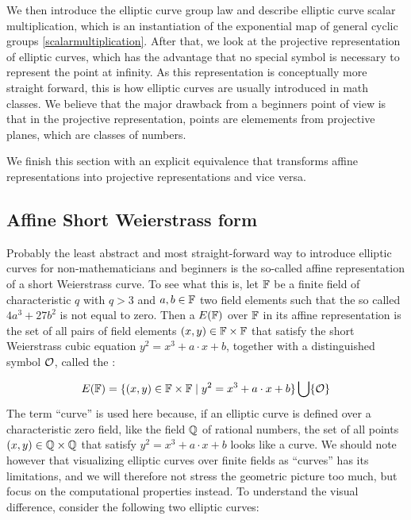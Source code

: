 We then introduce the elliptic curve group law and describe elliptic curve scalar multiplication, which is an instantiation of the exponential map of general cyclic groups \ref{scalarmultiplication}. After that, we look at the projective representation of elliptic curves, which has the advantage that no special symbol is necessary to represent the point at infinity. As this representation is conceptually more straight forward, this is how elliptic curves are usually introduced in math classes. We believe that the major drawback from a beginners point of view is that in the projective representation, points are elemements from projective planes, which are classes of numbers.

We finish this section with an explicit equivalence that transforms affine representations into projective representations and vice versa.

\subsection{Affine Short Weierstrass form} Probably the least abstract and most straight-forward way to introduce elliptic curves for non-mathematicians and beginners is the so-called affine representation of a short Weierstrass curve. To see what this is, let $\mathbb{F}$ be a finite field of characteristic $q$ with $q>3$ and $a,b\in \mathbb{F}$ two field elements such that the so called  $4a^3+ 27b^2$ is not equal to zero. Then a  $E(\mathbb{F})$ over $\mathbb{F}$ in its affine representation is the set of all pairs of field elements $(x,y)\in \mathbb{F}\times \mathbb{F}$ that satisfy the short Weierstrass cubic equation $y^2=x^3+a\cdot x+b$, together with a distinguished symbol $\mathcal{O}$, called the :

\begin{equation}
\label{def_short_weierstrass_curve}
E(\mathbb{F}) = \{(x,y)\in \mathbb{F}\times \mathbb{F}\;|\; y^2=x^3+a\cdot x+b \} \bigcup \{\mathcal{O}\}
\end{equation}
The term ``curve'' is used here because, if an elliptic curve is defined over a characteristic zero field, like the field $\mathbb{Q}$ of rational numbers, the set of all points $(x,y)\in \mathbb{Q}\times \mathbb{Q}$ that satisfy $y^2 = x^3 +a\cdot x +b$ looks like a curve. We should note however that visualizing elliptic curves over finite fields as ``curves'' has its limitations, and we will therefore not stress the geometric picture too much, but focus on the computational properties instead. To understand the visual difference, consider the following two elliptic curves: 

